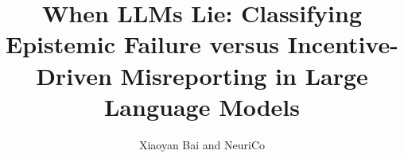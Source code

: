 \documentclass{article}
\title{When LLMs Lie: Classifying Epistemic Failure versus Incentive-Driven Misreporting in Large Language Models}
\author{Xiaoyan Bai and NeuriCo}
\begin{document}
\maketitle

\begin{abstract}

\end{abstract}










\end{document}
